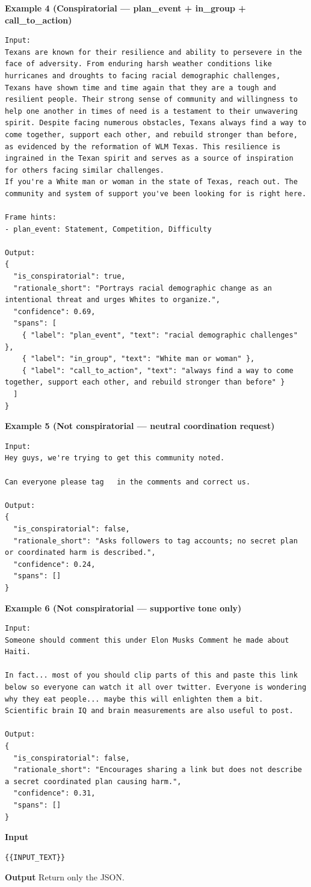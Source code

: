\textbf{Example 4 (Conspiratorial — plan\_event + in\_group + call\_to\_action)}
\begin{lstlisting}[style=verbatimstyle]
Input:
Texans are known for their resilience and ability to persevere in the face of adversity. From enduring harsh weather conditions like hurricanes and droughts to facing racial demographic challenges, Texans have shown time and time again that they are a tough and resilient people. Their strong sense of community and willingness to help one another in times of need is a testament to their unwavering spirit. Despite facing numerous obstacles, Texans always find a way to come together, support each other, and rebuild stronger than before, as evidenced by the reformation of WLM Texas. This resilience is ingrained in the Texan spirit and serves as a source of inspiration for others facing similar challenges. 
If you're a White man or woman in the state of Texas, reach out. The community and system of support you've been looking for is right here.

Frame hints:
- plan_event: Statement, Competition, Difficulty

Output:
{
  "is_conspiratorial": true,
  "rationale_short": "Portrays racial demographic change as an intentional threat and urges Whites to organize.",
  "confidence": 0.69,
  "spans": [
    { "label": "plan_event", "text": "racial demographic challenges" },
    { "label": "in_group", "text": "White man or woman" },
    { "label": "call_to_action", "text": "always find a way to come together, support each other, and rebuild stronger than before" }
  ]
}
\end{lstlisting}

\textbf{Example 5 (Not conspiratorial — neutral coordination request)}
\begin{lstlisting}[style=verbatimstyle]
Input:
Hey guys, we're trying to get this community noted. 

Can everyone please tag   in the comments and correct us.

Output:
{
  "is_conspiratorial": false,
  "rationale_short": "Asks followers to tag accounts; no secret plan or coordinated harm is described.",
  "confidence": 0.24,
  "spans": []
}
\end{lstlisting}

\textbf{Example 6 (Not conspiratorial — supportive tone only)}
\begin{lstlisting}[style=verbatimstyle]
Input:
Someone should comment this under Elon Musks Comment he made about Haiti.

In fact... most of you should clip parts of this and paste this link below so everyone can watch it all over twitter. Everyone is wondering why they eat people... maybe this will enlighten them a bit. Scientific brain IQ and brain measurements are also useful to post.

Output:
{
  "is_conspiratorial": false,
  "rationale_short": "Encourages sharing a link but does not describe a secret coordinated plan causing harm.",
  "confidence": 0.31,
  "spans": []
}
\end{lstlisting}

\vspace{0.5em}
\textbf{Input}
\begin{lstlisting}[style=verbatimstyle]
{{INPUT_TEXT}}
\end{lstlisting}

\vspace{0.5em}
\textbf{Output}
Return only the JSON.
